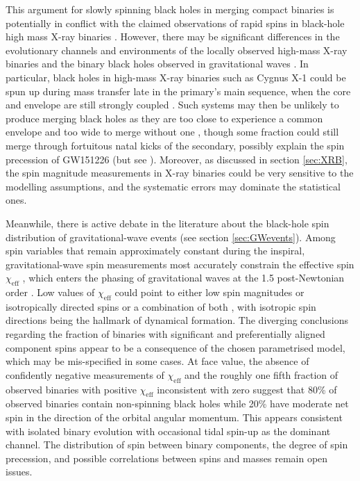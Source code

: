\documentclass[review]{elsarticle}
\begin{document}
This argument for slowly spinning black holes in merging compact binaries is potentially in conflict with the claimed observations of rapid spins in black-hole high mass X-ray binaries \citep{FishbachKalogera:2021}.   However, there may be significant differences in the evolutionary channels and environments of the locally observed high-mass X-ray binaries and the binary black holes observed in gravitational waves \citep[][and see section \ref{environ}]{HotokezakaPiran:2017}.  In particular, black holes in high-mass X-ray binaries such as Cygnus X-1 could be spun up during mass transfer late in the primary's main sequence, when the core and envelope are still strongly coupled \citep{Valsecchi:2010,Qin:2018}.  Such systems may then be unlikely to produce merging black holes as they are too close to experience a common envelope and too wide to merge without one \citep{Neijssel:2020CygX1}, though some fraction could still merge through fortuitous natal kicks of the secondary, possibly explain the spin precession of GW151226 \citep{Chia:2021} (but see \cite{GW151226,MateuLucena:2021}).  Moreover, as discussed in section \ref{sec:XRB}, the spin magnitude measurements in X-ray binaries could be very sensitive to the modelling assumptions, and the systematic errors may dominate the statistical ones.

Meanwhile, there is active debate in the literature about the black-hole spin distribution of gravitational-wave events (see section \ref{sec:GWevents}).  Among spin variables that remain approximately constant during the inspiral, gravitational-wave spin measurements most accurately constrain the effective spin $\chi_\mathrm{eff}$ \citep{Racine:2008,Ajith:2011}, which enters the phasing of gravitational waves at the 1.5 post-Newtonian order \citep{PoissonWill:1995}.  Low values of $\chi_\mathrm{eff}$ could point to either low spin magnitudes or isotropically directed spins or a combination of both \citep{Farr:2017}, with isotropic spin directions being the hallmark of dynamical formation.  The diverging conclusions regarding the fraction of binaries with significant and preferentially aligned component spins \citep{GWTC2:pop,GWTC3:pop,Roulet:2021,Callister:2021,Galaudage:2021} appear to be a consequence of the chosen parametrised model, which may be mis-specified in some cases.  At face value, the absence of confidently negative measurements of $\chi_\mathrm{eff}$ and the roughly one fifth fraction of observed binaries with positive $\chi_\mathrm{eff}$ inconsistent with zero suggest that 80\% of observed binaries contain non-spinning black holes while 20\% have moderate net spin in the direction of the orbital angular momentum.  This appears consistent with isolated binary evolution with occasional tidal spin-up as the dominant channel.  The distribution of spin between binary components, the degree of spin precession, and possible correlations between spins and masses remain open issues. 
\end{document}
